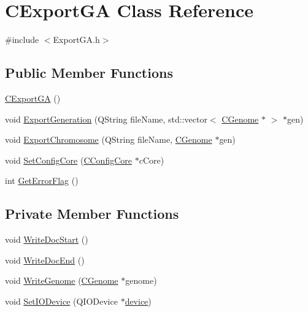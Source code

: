 \hypertarget{classCExportGA}{
\section{CExportGA Class Reference}
\label{classCExportGA}
}


{\ttfamily \#include $<$ExportGA.h$>$}\subsection*{Public Member Functions}
\begin{DoxyCompactItemize}
\item 
\hyperlink{classCExportGA_a309d0b41af0bc98a55137036dae666c0}{CExportGA} ()
\item 
void \hyperlink{classCExportGA_a31d3ac536a7ff74d7739208effef4bd7}{ExportGeneration} (QString fileName, std::vector$<$ \hyperlink{classCGenome}{CGenome} $\ast$ $>$ $\ast$gen)
\item 
void \hyperlink{classCExportGA_ac9f851d52b55ecca7a4b4d318d673f24}{ExportChromosome} (QString fileName, \hyperlink{classCGenome}{CGenome} $\ast$gen)
\item 
void \hyperlink{classCExportGA_a46317749555daaf7e405715075298a20}{SetConfigCore} (\hyperlink{classCConfigCore}{CConfigCore} $\ast$cCore)
\item 
int \hyperlink{classCExportGA_a9ada1a72c5eb021637f9356c7a85a661}{GetErrorFlag} ()
\end{DoxyCompactItemize}
\subsection*{Private Member Functions}
\begin{DoxyCompactItemize}
\item 
void \hyperlink{classCExportGA_acea05138092ae64ba357a4912a0bf439}{WriteDocStart} ()
\item 
void \hyperlink{classCExportGA_ad0fa22bd7fb670f980220e908009a9aa}{WriteDocEnd} ()
\item 
void \hyperlink{classCExportGA_a422e44e86f39b68cb9e3eaf72229068b}{WriteGenome} (\hyperlink{classCGenome}{CGenome} $\ast$genome)
\item 
void \hyperlink{classCExportGA_a8a285ef63836c0b454cbcfb08032746a}{SetIODevice} (QIODevice $\ast$\hyperlink{classCExportGA_a89a558515aefb9ca36180116bf76e04d}{device})
\end{DoxyCompactItemize}
